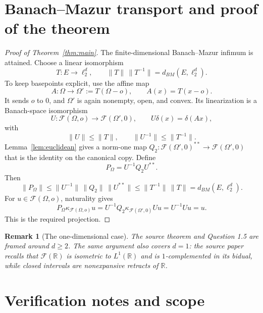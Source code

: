\documentclass[11pt]{article}
\newtheorem{remark}[theorem]{Remark}
\newcommand{\F}{\mathcal F}
\newcommand{\R}{\mathbb R}
\begin{document}
\section{Banach--Mazur transport and proof of the theorem}

\begin{proof}[Proof of Theorem~\ref{thm:main}]
The finite-dimensional Banach--Mazur infimum is attained.  Choose a linear
isomorphism
\[
 T:E\longrightarrow\ell_2^d,
 \qquad \|T\|\,\|T^{-1}\|=d_{BM}(E,\ell_2^d).
\]
To keep basepoints explicit, use the affine map
\[
 A:\Omega\longrightarrow\Omega':=T(\Omega-o),
 \qquad A(x)=T(x-o).
\]
It sends $o$ to $0$, and $\Omega'$ is again nonempty, open, and convex.  Its
linearization is a Banach-space isomorphism
\[
 U:\F(\Omega,o)\longrightarrow\F(\Omega',0),
 \qquad U\delta(x)=\delta(Ax),
\]
with
\[
 \|U\|\leq\|T\|,
 \qquad \|U^{-1}\|\leq\|T^{-1}\|.
\]
Lemma~\ref{lem:euclidean} gives a norm-one map
$Q_2:\F(\Omega',0)^{**}\to\F(\Omega',0)$ that is the identity on the
canonical copy.  Define
\[
 P_\Omega=U^{-1}Q_2U^{**}.
\]
Then
\[
 \|P_\Omega\|
 \leq\|U^{-1}\|\,\|Q_2\|\,\|U^{**}\|
 \leq\|T^{-1}\|\,\|T\|
 =d_{BM}(E,\ell_2^d).
\]
For $u\in\F(\Omega,o)$, naturality gives
\[
 P_\Omega\kappa_{\F(\Omega,o)}u
 =U^{-1}Q_2\kappa_{\F(\Omega',0)}Uu
 =U^{-1}Uu=u.
\]
This is the required projection.
\end{proof}

\begin{remark}[The one-dimensional case]
The source theorem and Question 1.5 are framed around $d\geq2$.  The same
argument also covers $d=1$: the source paper recalls that $\F(\R)$ is
isometric to $L^1(\R)$ and is $1$-complemented in its bidual, while closed
intervals are nonexpansive retracts of $\R$.
\end{remark}

\section{Verification notes and scope}
\end{document}
